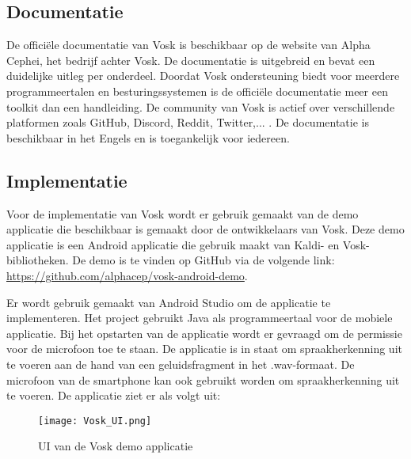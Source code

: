 \subsection{Documentatie}
De officiële documentatie van Vosk is beschikbaar op de website van Alpha Cephei, het bedrijf achter Vosk. De documentatie is uitgebreid en bevat een duidelijke uitleg per onderdeel. Doordat Vosk ondersteuning biedt voor meerdere programmeertalen en besturingssystemen is de officiële documentatie meer een toolkit dan een handleiding. De community van Vosk is actief over verschillende platformen zoals GitHub, Discord, Reddit, Twitter,... . De documentatie is beschikbaar in het Engels en is toegankelijk voor iedereen.

\subsection{Implementatie}
Voor de implementatie van Vosk wordt er gebruik gemaakt van de demo applicatie die beschikbaar is gemaakt door de ontwikkelaars van Vosk. Deze demo applicatie is een Android applicatie die gebruik maakt van Kaldi- en Vosk-bibliotheken. De demo is te vinden op GitHub via de volgende link:
\url{https://github.com/alphacep/vosk-android-demo}.\newline

Er wordt gebruik gemaakt van Android Studio om de applicatie te implementeren. Het project gebruikt Java als programmeertaal voor de mobiele applicatie. Bij het opstarten van de applicatie wordt er gevraagd om de permissie voor de microfoon toe te staan. De applicatie is in staat om spraakherkenning uit te voeren aan de hand van een geluidsfragment in het .wav-formaat. De microfoon van de smartphone kan ook gebruikt worden om spraakherkenning uit te voeren. De applicatie ziet er als volgt uit:
\begin{figure}[H]
  \centering
  \texttt{[image: Vosk\_UI.png]}
  \caption{UI van de Vosk demo applicatie}
\end{figure}

